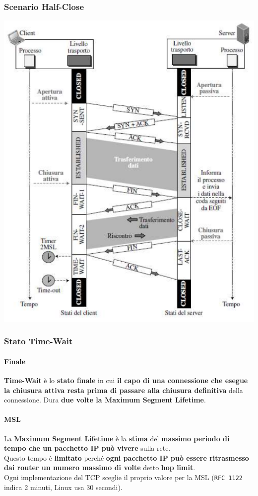 \documentclass[10pt]{article}
\begin{document}
\subsubsection{Scenario Half-Close}
\begin{center}
\includegraphics[scale=1]{halfclosees.png}
\end{center}
\subsubsection{Stato Time-Wait}
\paragraph{Finale} \textbf{Time-Wait} è lo \textbf{stato finale} in cui \textbf{il capo di una connessione che esegue la chiusura attiva resta prima di passare alla chiusura definitiva} della connessione. Dura \textbf{due volte la Maximum Segment Lifetime}.
\paragraph{MSL} La \textbf{Maximum Segment Lifetime} è la \textbf{stima} del \textbf{massimo periodo di tempo che un pacchetto IP può vivere} sulla rete.\\
Questo tempo è \textbf{limitato} perché \textbf{ogni pacchetto IP può essere ritrasmesso dai router un numero massimo di volte} detto \textbf{hop limit}.\\
Ogni implementazione del TCP sceglie il proprio valore per la MSL (\texttt{RFC 1122} indica 2 minuti, Linux usa 30 secondi).
\end{document}
